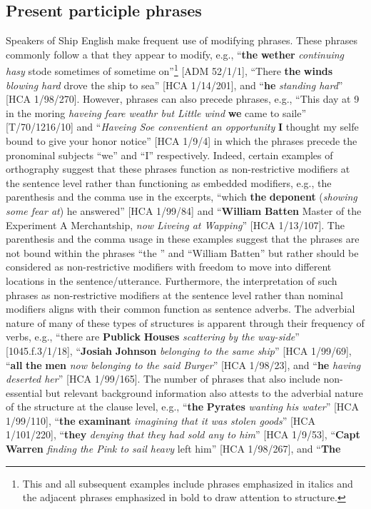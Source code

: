 \subsection{{Present participle phrases} }%

Speakers of Ship English make frequent use of modifying  phrases. These  phrases commonly follow a  that they appear to modify, e.g., “\textbf{the} \textbf{wether} \textit{continuing hasy} stode sometimes of sometime on”\footnote{This and all subsequent examples include  phrases emphasized in italics and the adjacent  phrases emphasized in bold to draw attention to structure.} [ADM 52/1/1], “There \textbf{the} \textbf{winds} \textit{blowing hard} drove the ship to sea” [HCA 1/14/201], and “\textbf{he} \textit{standing hard}” [HCA 1/98/270]. However,  phrases can also precede  phrases, e.g., “This day at 9 in the moring \textit{haveing feare weathr but Little wind} \textbf{we} came to saile” [T/70/1216/10] and “\textit{Haveing Soe conventient an opportunity} \textbf{I} thought my selfe bound to give your honor notice” [HCA 1/9/4] in which the  phrases precede the pronominal subjects “we” and “I” respectively. Indeed, certain examples of orthography suggest that these phrases function as non-restrictive modifiers at the sentence level rather than functioning as embedded   modifiers, e.g., the parenthesis and the comma use in the excerpts, “which \textbf{the} \textbf{deponent} (\textit{showing some fear at}) he answered” [HCA 1/99/84] and “\textbf{William} \textbf{Batten} Master of the Experiment A Merchantship, \textit{now Liveing at Wapping}” [HCA 1/13/107]. The parenthesis and the comma usage in these examples suggest that the phrases are not bound within the  phrases “the ” and “William Batten” but rather should be considered as non-restrictive modifiers with freedom to move into different locations in the sentence/utterance. Furthermore, the interpretation of such phrases as non-restrictive modifiers at the sentence level rather than nominal modifiers aligns with their common function as sentence adverbs. The adverbial nature of many of these types of structures is apparent through their frequency of  verbs, e.g., “there are \textbf{Publick} \textbf{Houses} \textit{scattering by the way-side}” [1045.f.3/1/18], “\textbf{Josiah} \textbf{Johnson} \textit{belonging to the same ship}” [HCA 1/99/69], “\textbf{all} \textbf{the} \textbf{men} \textit{now belonging to the said Burger}” [HCA 1/98/23], and “\textbf{he} \textit{having deserted her}” [HCA 1/99/165]. The number of phrases that also include non-essential but relevant background information also attests to the adverbial nature of the structure at the clause level, e.g., “\textbf{the} \textbf{Pyrates} \textit{wanting his water}” [HCA 1/99/110], “\textbf{the} \textbf{examinant} \textit{imagining that it was stolen goods}” [HCA 1/101/220], “\textbf{they} \textit{denying that they had sold any to him}” [HCA 1/9/53], “\textbf{Capt} \textbf{Warren} \textit{finding the Pink to sail heavy} left him” [HCA 1/98/267], and “\textbf{The} 